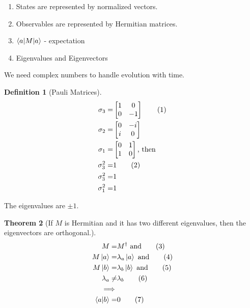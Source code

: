 \documentclass[]{article}
\newcommand\numberthis{\addtocounter{equation}{1}\tag{\theequation}}
\newtheorem{thm}{Theorem}
\newtheorem{defn}[thm]{Definition}
\begin{document}
\begin{enumerate}
	\item States are represented by normalized vectors.
	\item Observables are represented by Hermitian matrices.
	\item $\braket{a|M|a}$ - expectation
	\item Eigenvalues and Eigenvectors
\end{enumerate}


We need complex numbers to handle evolution with time.

\begin{defn}[Pauli Matrices]
	\begin{align*}
		\sigma_3 =& \begin{bmatrix} 1&0\\
			0&-1
		\end{bmatrix} \numberthis \label{eq:sigmas} \\
		\sigma_2 =& \begin{bmatrix}
			0 & -i\\
			i & 0
		\end{bmatrix}\\
		\sigma_1 =& \begin{bmatrix} 0&1\\
			1&0
		\end{bmatrix} \text{, then}\\
		\sigma_3^2 =& 1 \numberthis \label{eq:sigma_sq}\\
		\sigma_3^2 =& 1\\
		\sigma_1^2 =& 1
	\end{align*}
\end{defn}

The eigenvalues are $\pm1$.


\begin{thm}[If $M$ is Hermitian and it has two different eigenvalues, then the eigenvectors are orthogonal.]
	\begin{align*}
		M =& M^\dagger \text{ and} \numberthis \label{eq:hermitian}\\
		M \ket{a} =& \lambda_a \ket{a}\text{ and} \numberthis \label{eq:sigma_ev1}\\
		M \ket{b} =& \lambda_b \ket{b}\text{ and} \numberthis \label{eq:sigma_ev2}\\
		\lambda_a \ne& \lambda_b \numberthis \label{eq:ne} \\
		\implies&\\
		\braket{a \vert b} =& 0 \numberthis \label{eq:orthogonal}
	\end{align*}
\end{thm}
\end{document}
